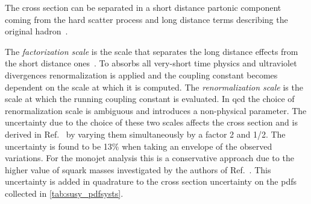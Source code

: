 The cross section can be separated in a short distance partonic component coming
from the hard scatter process and long distance terms describing the original
hadron~\cite{FactorizationScale}.

The \emph{factorization scale} is the scale that separates the long distance
effects from the short distance ones~\cite{PerturbativeQCDHandbook}. To absorbs
all very-short time physics and ultraviolet divergences renormalization is
applied and the coupling constant becomes dependent on the scale at which it is
computed. The \emph{renormalization scale} is the scale at which the running
coupling constant is evaluated. In \gls{qcd} the choice of renormalization scale
is ambiguous and introduces a non-physical parameter. The uncertainty due to the
choice of these two scales affects the cross section and is derived in
Ref.~\cite{SquarkGluinoTeam} by varying them simultaneously by a factor 2 and
1/2. The uncertainty is found to be 13\% when taking an envelope of the observed
variations. For the monojet analysis this is a conservative approach due to the
higher value of squark masses investigated by the authors of
Ref.~\cite{SquarkGluinoTeam}. This uncertainty is added in quadrature to the
cross section uncertainty on the \glspl{pdf} collected in
\cref{tab:susy_pdfsysts}.


